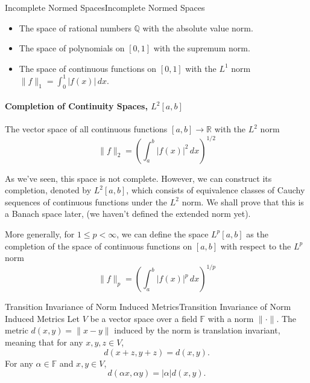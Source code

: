 \documentclass[../main.tex]{subfiles}
\begin{document}
\begin{example}{Incomplete Normed Spaces}{Incomplete Normed Spaces}
	\begin{itemize}
		\item The space of rational numbers $\mathbb{Q}$ with the absolute value norm.
		\item The space of polynomials on $[0, 1]$ with the supremum norm.
		\item The space of continuous functions on $[0, 1]$ with the $L^1$ norm $\|f\|_1 = \int_0^1 |f(x)| \, dx$.
	\end{itemize}
\end{example}

\paragraph{Completion of Continuity Spaces, $L^2[a, b]$}

The vector space of all continuous functions $[a,b] \rightarrow \mathbb{R}$ with the $L^2$ norm
\begin{equation}
	\|f\|_2 = \left( \int_a^b |f(x)|^2 \, dx \right)^{1/2}
\end{equation}

As we've seen, this space is not complete. However, we can construct its completion, denoted by $L^2[a, b]$, which consists of equivalence classes of Cauchy sequences of continuous functions under the $L^2$ norm. We shall prove that this is a Banach space later, (we haven't defined the extended norm yet).

More generally, for $1 \leq p < \infty$, we can define the space $L^p[a, b]$ as the completion of the space of continuous functions on $[a, b]$ with respect to the $L^p$ norm
\begin{equation}
	\|f\|_p = \left( \int_a^b |f(x)|^p \, dx \right)^{1/p}
\end{equation}

\begin{lemma}{Transition Invariance of Norm Induced Metrics}{Transition Invariance of Norm Induced Metrics}
	Let $V$ be a vector space over a field $\mathbb{F}$ with a norm $\|\cdot\|$. The metric $d(x, y) = \|x - y\|$ induced by the norm is translation invariant, meaning that for any $x, y, z \in V$,
	\begin{equation*}
		d(x + z, y + z) = d(x, y).
	\end{equation*}
	For any $\alpha\in \mathbb{F}$ and $x, y \in V$,
	\begin{equation*}
		d(\alpha x, \alpha y) = |\alpha| d(x, y).
	\end{equation*}
\end{lemma}
\end{document}
